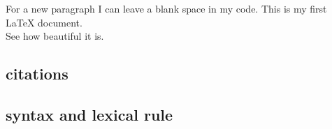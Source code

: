 For a new paragraph I can leave a blank space in my code. \blindtext[1]
This is my first LaTeX document. \\ See how beautiful it is.
\subsection*{citations}

\subsection*{syntax and lexical rule}
